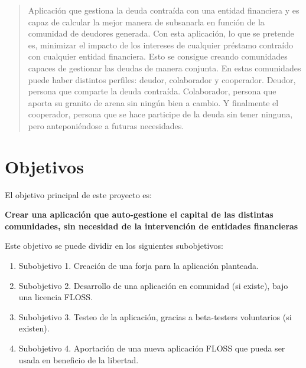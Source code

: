 \documentclass[10pt]{article}
\begin{document}
\title{}
\author{Diego Pardilla}
\date{\today}


\maketitle

\begin{abstract}
Aplicación que gestiona la deuda contraída con una entidad financiera y es capaz de calcular la mejor manera de subsanarla en función de la comunidad de deudores generada. Con esta aplicación, lo que se pretende es, minimizar el impacto de los intereses de cualquier préstamo contraído con cualquier entidad financiera. Esto se consigue creando comunidades capaces de gestionar las deudas de manera conjunta. En estas comunidades puede haber distintos perfiles: deudor, colaborador y cooperador. Deudor, persona que comparte la deuda contraída. Colaborador, persona que aporta su granito de arena sin ningún bien a cambio. Y finalmente el cooperador, persona que se hace participe de la deuda sin tener ninguna, pero anteponiéndose a futuras necesidades.
\end{abstract}

\section{Objetivos}

El objetivo principal de este proyecto es:

\begin{center}
\bf{Crear una aplicación que auto-gestione el capital de las distintas comunidades, sin necesidad de la intervención de entidades financieras}
\end{center}

Este objetivo se puede dividir en los siguientes subobjetivos:

\begin{enumerate}
  \item Subobjetivo 1. Creación de una forja para la aplicación planteada.
  \item Subobjetivo 2. Desarrollo de una aplicación en comunidad (si existe), bajo una licencia FLOSS.
  \item Subobjetivo 3. Testeo de la aplicación, gracias a beta-testers voluntarios (si existen).
  \item Subobjetivo 4. Aportación de una nueva aplicación FLOSS que pueda ser usada en beneficio de la libertad.
\end{enumerate}
\end{document}
